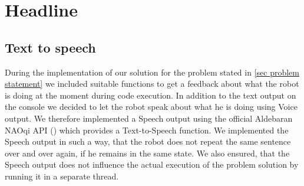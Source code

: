 \chapter{Headline}

\section{Text to speech}
During the implementation of our solution for the problem stated in \ref{sec problem statement} we included suitable functions to get a feedback about what the robot is doing at the moment during code execution. In addition to the text output on the console we decided to let the robot speak about what he is doing using Voice output. We therefore implemented a Speech output using the official Aldebaran NAOqi API (\cite{aldebarandocumentation}) which provides a Text-to-Speech function. We implemented the Speech output in such a way, that the robot does not repeat the same sentence over and over again, if he remains in the same state. We also ensured, that the Speech output does not influence the actual execution of the problem solution by running it in a separate thread.


